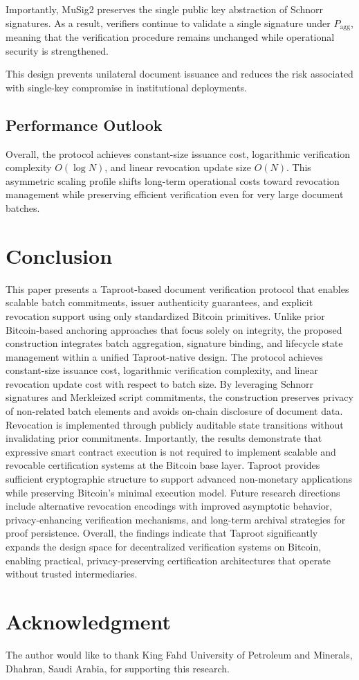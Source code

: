 \documentclass{IEEEoj}
\begin{document}
Importantly, MuSig2 preserves the single public key abstraction of Schnorr signatures. 
As a result, verifiers continue to validate a single signature under $P_{\mathrm{agg}}$, meaning that the verification procedure remains unchanged while operational security is strengthened.

This design prevents unilateral document issuance and reduces the risk
associated with single-key compromise in institutional deployments.

\subsection{Performance Outlook}

Overall, the protocol achieves constant-size issuance cost, logarithmic verification complexity $O(\log N)$, and linear revocation update size $O(N)$. 
This asymmetric scaling profile shifts long-term operational costs toward revocation management while preserving efficient verification even for very large document batches.





\section{Conclusion}
\label{sec_Conclusion}

This paper presents a Taproot-based document verification protocol that enables scalable batch commitments, issuer authenticity guarantees, and explicit revocation support using only standardized Bitcoin primitives. Unlike prior Bitcoin-based anchoring approaches that focus solely on integrity, the proposed construction integrates batch aggregation, signature binding, and lifecycle state management within a unified Taproot-native design. The protocol achieves constant-size issuance cost, logarithmic verification complexity, and linear revocation update cost with respect to batch size. By leveraging Schnorr signatures and Merkleized script commitments, the construction preserves privacy of non-related batch elements and avoids on-chain disclosure of document data. 
Revocation is implemented through publicly auditable state transitions without invalidating prior commitments. Importantly, the results demonstrate that expressive smart contract execution is not required to implement scalable and revocable certification systems at the Bitcoin base layer. 
Taproot provides sufficient cryptographic structure to support advanced non-monetary applications while preserving Bitcoin’s minimal execution model. Future research directions include alternative revocation encodings with improved asymptotic behavior, privacy-enhancing verification mechanisms, and long-term archival strategies for proof persistence. Overall, the findings indicate that Taproot significantly expands the design space for decentralized verification systems on Bitcoin, enabling practical, privacy-preserving certification architectures that operate without trusted intermediaries.


\section*{Acknowledgment}
The author would like to thank King Fahd University of Petroleum and Minerals, Dhahran, Saudi Arabia, for supporting this research. 



\end{document}
